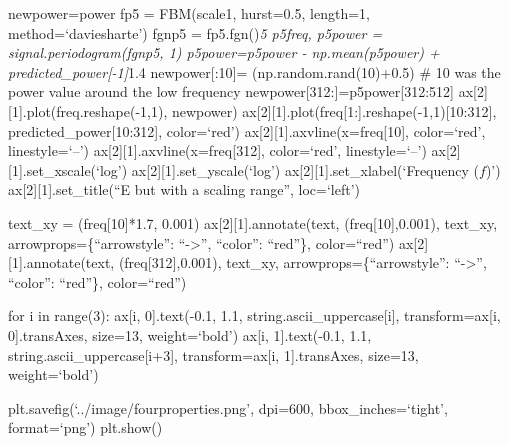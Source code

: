 \documentclass[
  sn-vancouver,
  Numbered,
  referee,
  lineno]{sn-jnl}
\begin{document}
newpower=power fp5 = FBM(scale1, hurst=0.5, length=1,
method=`daviesharte') fgnp5 = fp5.fgn()\emph{5 p5freq, p5power =
signal.periodogram(fgnp5, 1) p5power=p5power - np.mean(p5power) +
predicted\_power{[}-1{]}}1.4 newpower{[}:10{]}= (np.random.rand(10)+0.5)
\# 10 was the power value around the low frequency
newpower{[}312:{]}=p5power{[}312:512{]}
ax{[}2{]}{[}1{]}.plot(freq.reshape(-1,1), newpower)
ax{[}2{]}{[}1{]}.plot(freq{[}1:{]}.reshape(-1,1){[}10:312{]},
predicted\_power{[}10:312{]}, color=`red')
ax{[}2{]}{[}1{]}.axvline(x=freq{[}10{]}, color=`red', linestyle=`--')
ax{[}2{]}{[}1{]}.axvline(x=freq{[}312{]}, color=`red', linestyle=`--')
ax{[}2{]}{[}1{]}.set\_xscale(`log') ax{[}2{]}{[}1{]}.set\_yscale(`log')
ax{[}2{]}{[}1{]}.set\_xlabel(`Frequency (\(f\))')
ax{[}2{]}{[}1{]}.set\_title(``E but with a scaling range'', loc=`left')

text\_xy = (freq{[}10{]}*1.7, 0.001) ax{[}2{]}{[}1{]}.annotate(text,
(freq{[}10{]},0.001), text\_xy, arrowprops=\{``arrowstyle'':
``-\textgreater{}'', ``color'': ``red''\}, color=``red'')
ax{[}2{]}{[}1{]}.annotate(text, (freq{[}312{]},0.001), text\_xy,
arrowprops=\{``arrowstyle'': ``-\textgreater{}'', ``color'': ``red''\},
color=``red'')

for i in range(3): ax{[}i, 0{]}.text(-0.1, 1.1,
string.ascii\_uppercase{[}i{]}, transform=ax{[}i, 0{]}.transAxes,
size=13, weight=`bold') ax{[}i, 1{]}.text(-0.1, 1.1,
string.ascii\_uppercase{[}i+3{]}, transform=ax{[}i, 1{]}.transAxes,
size=13, weight=`bold')

plt.savefig(`../image/fourproperties.png', dpi=600,
bbox\_inches=`tight', format=`png') plt.show()
\end{document}

